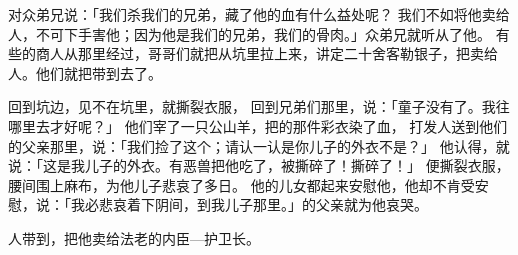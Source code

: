 {对众弟兄说：「我们杀我们的兄弟，藏了他的血有什么益处呢？
我们不如将他卖给{}人，不可下手害他；因为他是我们的兄弟，我们的骨肉。」众弟兄就听从了他。
有些{}的商人从那里经过，哥哥们就把{}从坑里拉上来，讲定二十舍客勒银子，把{}卖给{}人。他们就把{}带到{}去了。
\par }{\PP {}回到坑边，见{}不在坑里，就撕裂衣服，
回到兄弟们那里，说：「童子没有了。我往哪里去才好呢？」
他们宰了一只公山羊，把{}的那件彩衣染了血，
打发人送到他们的父亲那里，说：「我们捡了这个；请认一认是你儿子的外衣不是？」
他认得，就说：「这是我儿子的外衣。有恶兽把他吃了，{}被撕碎了！撕碎了！」
便撕裂衣服，腰间围上麻布，为他儿子悲哀了多日。
他的儿女都起来安慰他，他却不肯受安慰，说：「我必悲哀着下阴间，到我儿子那里。」{}的父亲就为他哀哭。
\par }{\PP {}人带{}到{}，把他卖给法老的内臣—护卫长{}。

}
